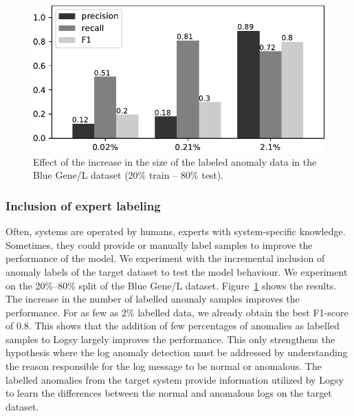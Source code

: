 \begin{figure}[!htbp]
\centering
\includegraphics[scale=0.7]{gfx/chap4/semisupervised.pdf}
\caption{Effect of the increase in the size of the labeled anomaly data in the Blue Gene/L dataset (20\% train -- 80\% test).}
\label{fig:semisupervised}
\end{figure}


\subsubsection{Inclusion of expert labeling}
Often, systems are operated by humans, experts with system-specific knowledge. Sometimes, they could provide or manually label samples to improve the performance of the model. We experiment with the incremental inclusion of anomaly labels of the target dataset to test the model behaviour. We experiment on the 20\%--80\% split of the Blue Gene/L dataset. 
Figure~\ref{fig:semisupervised} shows the results. The increase in the number of labelled anomaly samples improves the performance. For as few as 2\% labelled data, we already obtain the best F1-score of 0.8. This shows that the addition of few percentages of anomalies as labelled samples to Logsy largely improves the performance. This only strengthens the hypothesis where the log anomaly detection must be addressed by understanding the reason responsible for the log message to be normal or anomalous. The labelled anomalies from the target system provide information utilized by Logsy to learn the differences between the normal and anomalous logs on the target dataset.


